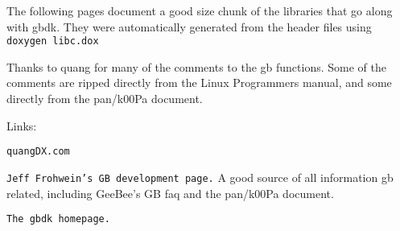  The following pages document a good size chunk of the libraries that go along with gbdk. They were automatically generated from the header files using {\tt doxygen libc.dox}

Thanks to quang for many of the comments to the gb functions. Some of the comments are ripped directly from the Linux Programmers manual, and some directly from the pan/k00Pa document.

Links:

{\tt quang\-DX.com}

{\tt Jeff Frohwein's GB development page.} A good source of all information gb related, including Gee\-Bee's GB faq and the pan/k00Pa document.

{\tt The gbdk homepage.}

